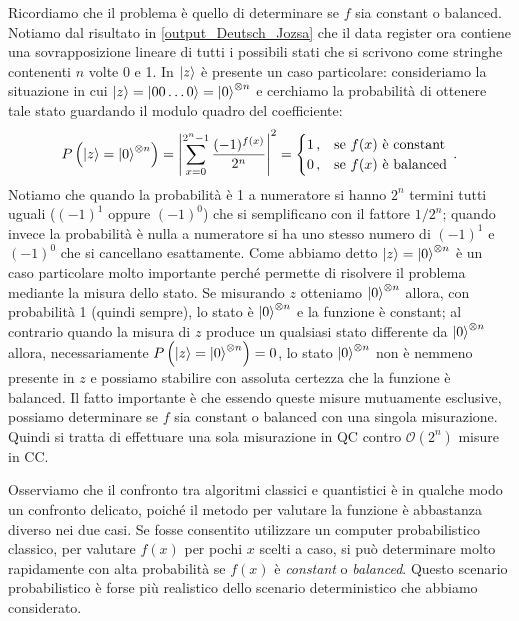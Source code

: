 \noindent Ricordiamo che il problema è quello di determinare se $f$ sia constant o balanced. Notiamo dal risultato in \eqref{output_Deutsch_Jozsa} che il data register ora contiene una sovrapposizione lineare di tutti i possibili stati che si scrivono come stringhe contenenti $n$ volte 0 e 1. In $\ket{z}$ è presente un caso particolare: consideriamo la situazione in cui $\ket z = \ket{00\ldots0} = \ket0^{\otimes n}$ e cerchiamo la probabilità di ottenere tale stato guardando il modulo quadro del coefficiente:
\begin{equation*}
    P \left( \ket{z} = \ket0^{\otimes n} \right) = \abs{\sum_{x=0}^{2^n-1}\frac{(-1)^{f(x)}}{2^n}}^2 = 
    \begin{cases}
    1 \, , &\text{se } f(x) \text{ è constant} \\
    0 \, , &\text{se } f(x) \text{ è balanced} 
    \end{cases} \, .
\end{equation*}
Notiamo che quando la probabilità è 1 a numeratore si hanno $2^n$ termini tutti uguali ($(-1)^1$ oppure $(-1)^0$) che si semplificano con il fattore $1/2^n$; quando invece la probabilità è nulla a numeratore si ha uno stesso numero di $(-1)^1$ e $(-1)^0$ che si cancellano esattamente. Come abbiamo detto $\ket z=\ket0^{\otimes n}$ è un caso particolare molto importante perché permette di risolvere il problema mediante la misura dello stato. Se misurando $z$ otteniamo $\ket{0}^{\otimes n}$ allora, con probabilità 1 (quindi sempre), lo stato è $\ket{0}^{\otimes n}$ e la funzione è constant; al contrario quando la misura di $z$ produce un qualsiasi stato differente da $\ket{0}^{\otimes n}$ allora, necessariamente $P \left( \ket{z} = \ket0^{\otimes n} \right) = 0$, lo stato $\ket{0}^{\otimes n}$ non è nemmeno presente in $z$ e possiamo stabilire con assoluta certezza che la funzione è balanced. Il fatto importante è che essendo queste misure mutuamente esclusive, possiamo determinare se $f$ sia constant o balanced con una singola misurazione. Quindi si tratta di effettuare una sola misurazione in QC contro $\mathcal{O}(2^n)$ misure in CC.

\noindent Osserviamo che il confronto tra algoritmi classici e quantistici è in qualche modo un confronto delicato, poiché il metodo per valutare la funzione è abbastanza diverso nei due casi. Se fosse consentito utilizzare un computer probabilistico classico, per valutare $f(x)$ per pochi $x$ scelti a caso, si può determinare molto rapidamente con alta probabilità se $f(x)$ è \textit{constant} o \textit{balanced}. Questo scenario probabilistico è forse più realistico dello scenario deterministico che abbiamo considerato.

